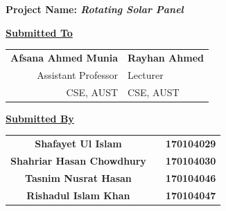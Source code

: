 \begin{titlepage}
\begin{center}
        \large
        \textbf{Project Name: \emph{Rotating Solar Panel}}
        
        \vspace{.2cm}
        \large
        \textbf{\underline{Submitted To}}\\
        \begin{table}[H]
        \centering
        \begin{tabular}{r|l}
        \textbf{\large{Afsana Ahmed Munia}} & \textbf{\large{Rayhan Ahmed}} \\
        Assistant Professor & Lecturer \\
        CSE, AUST & CSE, AUST
        \end{tabular}
        \end{table}
        \large
        \textbf{\underline{Submitted By}}\\
        \begin{table}[H]
            \centering
            \Large
            \begin{tabular}{ccc}
            \textbf{Shafayet Ul Islam} & \textbf{} & \textbf{170104029} \\
            \textbf{Shahriar Hasan Chowdhury} & \textbf{} & \textbf{170104030} \\
            \textbf{Tasnim Nusrat Hasan} & \textbf{} & \textbf{170104046} \\
            \textbf{Rishadul Islam Khan} & \textbf{} & \textbf{170104047}\\
            \end{tabular}
        \end{table}
    \end{center}
\end{titlepage}